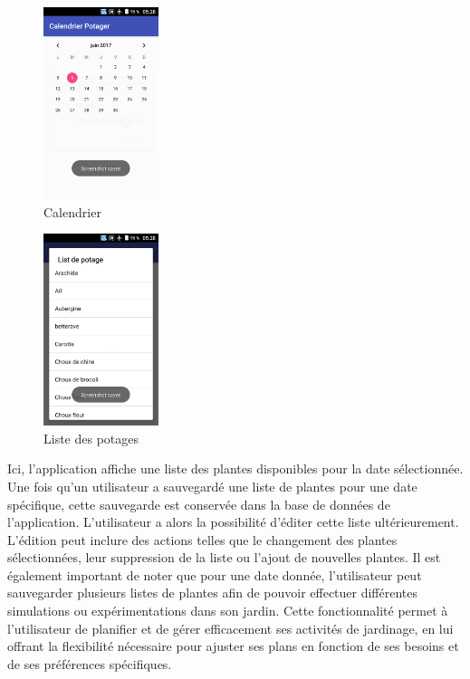 \begin{figure}[H]
    	\center
    		\includegraphics[width=0.3\textwidth]{image/3}
   		\caption{Calendrier}
    	\label{Calendrier}
	\end{figure}
		\begin{figure}[!h]
    	\center
    		\includegraphics[width=0.3\textwidth]{image/4}
   		\caption{Liste des potages}
    	\label{Liste des potages}
	\end{figure}
Ici, l'application affiche une liste des plantes disponibles pour la date sélectionnée. Une fois qu'un utilisateur a sauvegardé une liste de plantes pour une date spécifique, cette sauvegarde est conservée dans la base de données de l'application. L'utilisateur a alors la possibilité d'éditer cette liste ultérieurement. L'édition peut inclure des actions telles que le changement des plantes sélectionnées, leur suppression de la liste ou l'ajout de nouvelles plantes. Il est également important de noter que pour une date donnée, l'utilisateur peut sauvegarder plusieurs listes de plantes afin de pouvoir effectuer différentes simulations ou expérimentations dans son jardin. Cette fonctionnalité permet à l'utilisateur de planifier et de gérer efficacement ses activités de jardinage, en lui offrant la flexibilité nécessaire pour ajuster ses plans en fonction de ses besoins et de ses préférences spécifiques.
